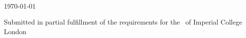\begin{titlepage}

 \\[1cm]
{\large \today} %


\vfill %
Submitted in partial fulfillment of the requirements for the \degreetype~of Imperial College London

\end{titlepage}

